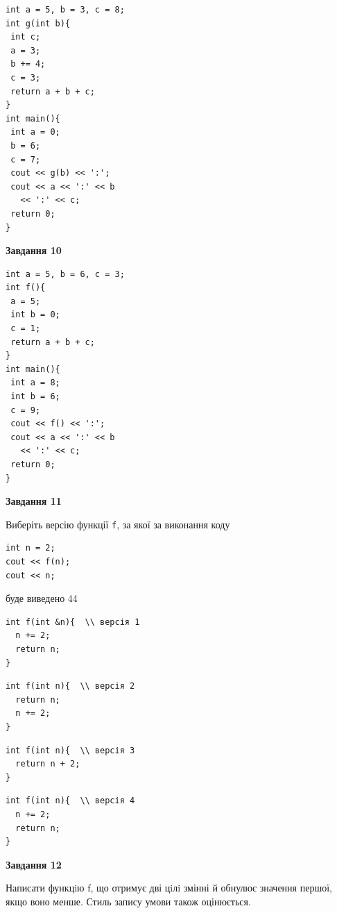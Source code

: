 \documentclass[12pt, ukrainian]{article}
\def\code#1{\Verb!#1!}
\begin{document}
{\begin {large}
\begin{minipage}[t]{7.0cm}
\begin{verbatim}
int a = 5, b = 3, c = 8;
int g(int b){
 int c;
 a = 3;
 b += 4;
 c = 3;
 return a + b + c;
}
int main(){
 int a = 0;
 b = 6;
 c = 7;
 cout << g(b) << ':';
 cout << a << ':' << b 
   << ':' << c;
 return 0;
}
\end{verbatim}



\begin{center}
\textbf{Завдання 10}
\end{center}
\vspace{-8mm}

\begin{verbatim}
int a = 5, b = 6, c = 3;
int f(){
 a = 5;
 int b = 0;
 c = 1;
 return a + b + c;
}
int main(){
 int a = 8;
 int b = 6;
 c = 9;
 cout << f() << ':';
 cout << a << ':' << b 
   << ':' << c;
 return 0;
}
\end{verbatim}

\end{minipage}
\vline \hspace{1mm}
\begin{minipage}[t]{11.0cm}

\begin{center}
\textbf{Завдання 11}
\end{center}
Виберіть версію функції \code{f}, за якої за виконання коду
\begin{verbatim}
int n = 2;
cout << f(n);
cout << n;
\end{verbatim}

буде виведено 44

\begin{verbatim}
int f(int &n){  \\ версія 1
  n += 2;
  return n;
}
\end{verbatim}

\vspace{-8mm}\begin{verbatim}
int f(int n){  \\ версія 2
  return n;
  n += 2;
}
\end{verbatim}

\vspace{-8mm}\begin{verbatim}
int f(int n){  \\ версія 3
  return n + 2;
}
\end{verbatim}

\vspace{-8mm}\begin{verbatim}
int f(int n){  \\ версія 4
  n += 2;
  return n;
}
\end{verbatim}



\begin{center}
\textbf{Завдання 12}
\end{center}

Написати функцiю f, що отримує дві цiлi змінні й обнулює значення першої, якщо воно менше. Стиль запису умови також оцінюється.\par

\end{minipage}

\end {large}}
\end{document}
